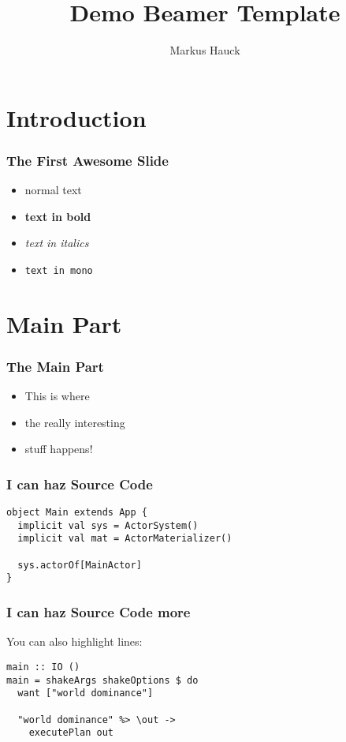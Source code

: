 \documentclass{beamer}
\title{Demo Beamer Template}
\author{Markus Hauck}
\begin{document}
\begin{frame}
  \titlepage{}
\end{frame}

\section{Introduction}\label{sec:introduction}
 
\begin{frame}
\frametitle{The First Awesome Slide}
\begin{itemize}
\item normal text
\item \textbf{text in bold}
\item \textit{text in italics}
\item \texttt{text in mono}
\end{itemize}
\end{frame}

\section{Main Part}\label{sec:main-part}
\begin{frame}
  \frametitle{The Main Part}
  \begin{itemize}
  \item This is where
  \item the really interesting
  \item stuff happens!
  \end{itemize}
\end{frame}

\begin{frame}[fragile]
  \frametitle{I can haz Source Code}
  \begin{center}
\begin{verbatim}
object Main extends App {
  implicit val sys = ActorSystem()
  implicit val mat = ActorMaterializer()
  
  sys.actorOf[MainActor]
}
\end{verbatim}
  \end{center}
\end{frame}

\begin{frame}[fragile]
  \frametitle{I can haz Source Code more}
  You can also highlight lines:
  \begin{center}
\begin{verbatim}
main :: IO ()
main = shakeArgs shakeOptions $ do
  want ["world dominance"]

  "world dominance" %> \out ->
    executePlan out
\end{verbatim}
  \end{center}
\end{frame}
\end{document}
